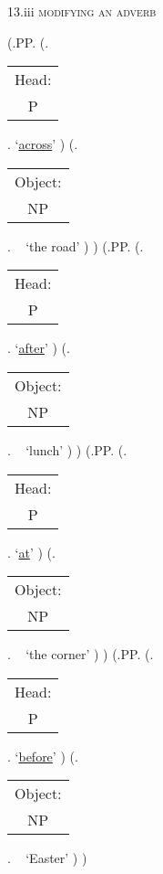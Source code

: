 \documentclass[12pt,letterpaper]{article}
\begin{document}
\begin{figure}
\begin{center}
\begin{parsetree}
			\hfill \break\hfill \break
		\end{parsetree}
		13.iii \textsc{modifying an adverb}
	\end{center}
\end{figure}

\begin{figure}
	\begin{center}
		\begin{parsetree}
			(.PP.
			(.\begin{tabular}{c}Head:\\P\end{tabular}. `\underline{across}' )
			(.\begin{tabular}{c}Object:\\NP\end{tabular}. ~ `the road' )
			)
			(.PP.
			(.\begin{tabular}{c}Head:\\P\end{tabular}. `\underline{after}' )
			(.\begin{tabular}{c}Object:\\NP\end{tabular}. ~ `lunch' )
			)
			(.PP.
			(.\begin{tabular}{c}Head:\\P\end{tabular}. `\underline{at}' )
			(.\begin{tabular}{c}Object:\\NP\end{tabular}. ~ `the corner' )
			)
			(.PP.
			(.\begin{tabular}{c}Head:\\P\end{tabular}. `\underline{before}' )
			(.\begin{tabular}{c}Object:\\NP\end{tabular}. ~ `Easter' )
			)
			

\end{parsetree}
\end{center}
\end{figure}
\end{document}
